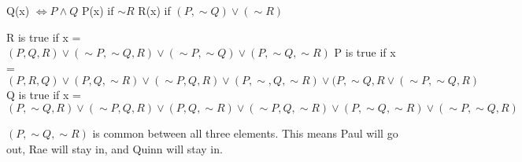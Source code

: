 \documentclass{article}
\begin{document}
\begin{enumerate}[labelindent=0pt,leftmargin=0pt]
\subitem Q(x) $\Leftrightarrow P \land Q$
\subitem P(x) if $\sim\!R$
\subitem R(x)  if $(P, \sim\!Q)\lor(\sim\!R)$

\subitem R is true if x = $(P,Q,R) \lor (\sim\!P,\sim\!Q,R) \lor (\sim\!P,\sim\!Q) \lor (P,\sim\!Q,\sim\!R)$
\subitem P is true if x = $(P,R,Q) \lor (P,Q, \sim\!R) \lor (\sim\!P,Q,R) \lor (P,\sim\!,Q,\sim\!R) \lor (P, \sim\!Q, R \lor (\sim\!P,\sim\!Q,R)$
\subitem Q is true if x = $(P,\sim\!Q,R) \lor (\sim\!P,Q,R) \lor (P,Q,\sim\!R) \lor (\sim\!P,Q,\sim\!R) \lor (P,\sim\!Q,\sim\!R) \lor (\sim\!P,\sim\!Q,R)$

\subitem $(P,\sim\!Q,\sim\!R)$ is common between all three elements.
\subitem This means Paul will go out, Rae will stay in, and Quinn will stay in. 

\end{enumerate}
\end{document}
